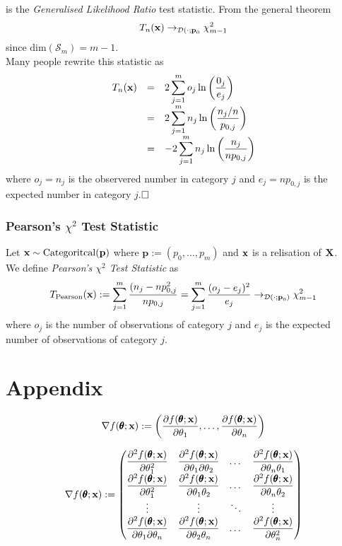 \documentclass[11pt,a4paper]{article}
\begin{document}
is the \textit{Generalised Likelihood Ratio} test statistic. From the general theorem
$$T_n(\textbf{x})\to_{\mathcal{D}(\cdot;\textbf{p}_0}\chi^2_{m-1}$$
since $\text{dim}(\mathcal{S}_m)=m-1$.\\
Many people rewrite this statistic as
\[\begin{array}{rcl}
T_n(\textbf{x})&=&{\displaystyle2\sum_{j=1}^mo_j\ln\left(\frac{0_j}{e_j}\right)}\\
&=&{\displaystyle2\sum_{j=1}^mn_j\ln\left(\frac{n_j/n}{p_{0,j}}\right)}\\
&=&{\displaystyle-2\sum_{j=1}^mn_j\ln\left(\frac{n_j}{np_{0,j}}\right)}
\end{array}\]
where $o_j=n_j$ is the observered number in category $j$ and $e_j=np_{0,j}$ is the expected number in category $j$.$\hfill\square$

\subsubsection{Pearson's $\chi^2$ Test Statistic}

Let $\textbf{x}\sim\text{Categoritcal}(\textbf{p})$ where $\textbf{p}:=(p_0,\dots,p_m)$ and $\textbf{x}$ is a relisation of $\textbf{X}$.\\
We define \textit{Pearson's $\chi^2$ Test Statistic}  as
$$T_\text{Pearson}(\textbf{x}):=\sum_{j=1}^m\frac{(n_j-np_{0,j}^2}{np_{0,j}}=\sum_{j=1}^m\frac{(o_j-e_j)^2}{e_j}\to_{\mathcal{D}(\cdot;\textbf{p}_0)}\chi^2_{m-1}$$
where $o_j$ is the number of observations of category $j$ and $e_j$ is the expected number of observations of category $j$.

\newpage
\setcounter{section}{-1}
\section{Appendix}

$$\nabla f(\pmb{\theta};\textbf{x}):=\left(\dfrac{\partial f(\pmb{\theta};\textbf{x})}{\partial\theta_1},\dots,\dfrac{\partial f(\pmb{\theta};\textbf{x})}{\partial\theta_n}\right)$$

$$\nabla f(\pmb{\theta};\textbf{x}):=\begin{pmatrix}
\dfrac{\partial^2 f(\pmb{\theta};\textbf{x})}{\partial\theta_1^2}&\dfrac{\partial^2 f(\pmb{\theta};\textbf{x})}{\partial\theta_1\partial\theta_2}&\dots&\dfrac{\partial^2 f(\pmb{\theta};\textbf{x})}{\partial\theta_n\theta_1}\\
\dfrac{\partial^2 f(\pmb{\theta};\textbf{x})}{\partial\theta_1^2}&\dfrac{\partial^2 f(\pmb{\theta};\textbf{x})}{\partial\theta_1\theta_2}&\dots&\dfrac{\partial^2 f(\pmb{\theta};\textbf{x})}{\partial\theta_n\theta_2}\\
\vdots&\vdots&\ddots&\vdots\\
\dfrac{\partial^2 f(\pmb{\theta};\textbf{x})}{\partial\theta_1\partial\theta_n}&\dfrac{\partial^2 f(\pmb{\theta};\textbf{x})}{\partial\theta_2\theta_n}&\dots&\dfrac{\partial^2 f(\pmb{\theta};\textbf{x})}{\partial\theta_n^2}
\end{pmatrix}$$
\end{document}
